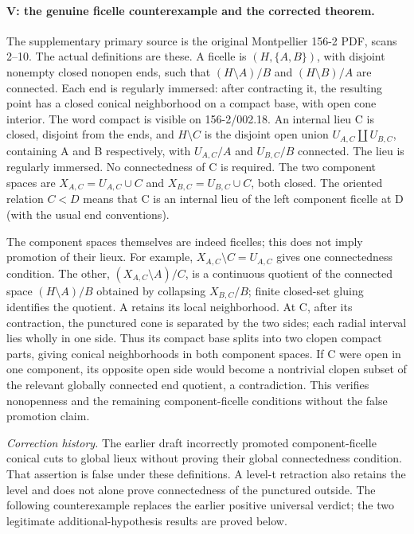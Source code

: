 \paragraph{V: the genuine ficelle counterexample and the corrected theorem.}\label{lem:ficelle}
The supplementary primary source is the original Montpellier 156-2 PDF, scans 2--10. The actual definitions are these. A ficelle is $(H,\{A,B\})$, with disjoint nonempty closed nonopen ends, such that $(H\setminus A)/B$ and $(H\setminus B)/A$ are connected. Each end is regularly immersed: after contracting it, the resulting point has a closed conical neighborhood on a compact base, with open cone interior. The word compact is visible on 156-2/002.18. An internal lieu C is closed, disjoint from the ends, and $H\setminus C$ is the disjoint open union $U_{A,C}\amalg U_{B,C}$, containing A and B respectively, with $U_{A,C}/A$ and $U_{B,C}/B$ connected. The lieu is regularly immersed. No connectedness of C is required. The two component spaces are $X_{A,C}=U_{A,C}\cup C$ and $X_{B,C}=U_{B,C}\cup C$, both closed. The oriented relation $C<D$ means that C is an internal lieu of the left component ficelle at D (with the usual end conventions).

The component spaces themselves are indeed ficelles; this does not imply promotion of their lieux. For example, $X_{A,C}\setminus C=U_{A,C}$ gives one connectedness condition. The other, $(X_{A,C}\setminus A)/C$, is a continuous quotient of the connected space $(H\setminus A)/B$ obtained by collapsing $X_{B,C}/B$; finite closed-set gluing identifies the quotient. A retains its local neighborhood. At C, after its contraction, the punctured cone is separated by the two sides; each radial interval lies wholly in one side. Thus its compact base splits into two clopen compact parts, giving conical neighborhoods in both component spaces. If C were open in one component, its opposite open side would become a nontrivial clopen subset of the relevant globally connected end quotient, a contradiction. This verifies nonopenness and the remaining component-ficelle conditions without the false promotion claim.

\emph{Correction history.} The earlier draft incorrectly promoted component-ficelle conical cuts to global lieux without proving their global connectedness condition. That assertion is false under these definitions. A level-t retraction also retains the level and does not alone prove connectedness of the punctured outside. The following counterexample replaces the earlier positive universal verdict; the two legitimate additional-hypothesis results are proved below.

